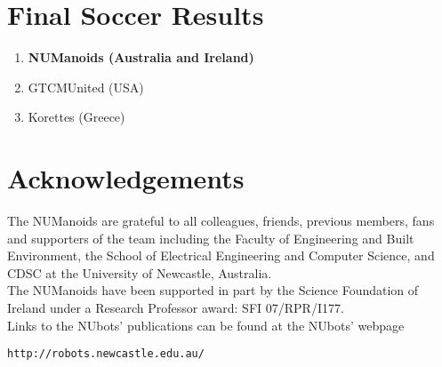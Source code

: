 \section{Final Soccer Results}

\begin{enumerate}
    \item \textbf{NUManoids (Australia and Ireland)}
    \item GTCMUnited (USA)
    \item Korettes (Greece)
\end{enumerate}
\section{Acknowledgements}
 \noindent The NUManoids are grateful to all colleagues,
friends, previous members, fans and supporters of the team including  the Faculty of Engineering and Built Environment, the School of Electrical Engineering and Computer Science, and CDSC at the University of Newcastle, Australia.\\
The NUManoids have been supported in part by the Science Foundation
of Ireland under a Research Professor award: SFI 07/RPR/I177.\\

\noindent Links to the NUbots' publications can be found at the
NUbots' webpage
\begin{center}
\texttt{http://robots.newcastle.edu.au/}
\end{center}

